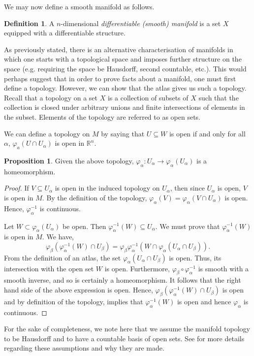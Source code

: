 \documentclass[12pt,a4paper]{article}
\numberwithin{equation}{section}
\theoremstyle{definition}
\newtheorem{definition}{Definition}[section]
\newtheorem{proposition}{Proposition}[section]
\theoremstyle{remark}
\begin{document}
We may now define a smooth manifold as follows.
\begin{definition}
A $n$-dimensional \textit{differentiable (smooth) manifold} is a set $X$ equipped with a differentiable structure.
\end{definition}
As previously stated, there is an alternative characterisation of manifolds in which one starts with a topological space and imposes further structure on the space (e.g. requiring the space be Hausdorff, second countable, etc.). This would perhaps suggest that in order to prove facts about a manifold, one must first define a topology. However, we can show that the atlas gives us such a topology.\\

Recall that a topology on a set $X$ is a collection of subsets of $X$ such that the collection is closed under arbitrary unions and finite intersections of elements in the subset. Elements of the topology are referred to as open sets.

We can define a topology on $M$ by saying that $U\subseteq W$ is open if and only for all $\alpha$, $\varphi_a(U\cap U_\alpha)$ is open in $\mathbb{R}^n$.

\begin{proposition}
Given the above topology, $\varphi_\alpha :U_\alpha\to\varphi_\alpha(U_\alpha)$ is a homeomorphism.
\end{proposition}
\begin{proof}
If $V\subseteq U_\alpha$ is open in the induced topology on $U_\alpha$, then since $U_\alpha$ is open, $V$ is open in $M$. By the definition of the topology, $\varphi_\alpha(V)=\varphi_\alpha(V\cap U_\alpha)$ is open. Hence, $\varphi^{-1}_\alpha$ is continuous.

Let $W\subset\varphi_\alpha(U_\alpha)$ be open. Then $\varphi_\alpha^{-1}(W)\subseteq U_\alpha$. We must prove that $\varphi_\alpha^{-1}(W)$ is open in $M$. We have,
\[
\varphi_\beta(\varphi_\alpha^{-1}(W)\cap U_\beta)=\varphi_\beta\varphi_\alpha^{-1}\left(W\cap\varphi_\alpha(U_\alpha\cap U_\beta)\right).
\]
From the definition of an atlas, the set $\varphi_\alpha(U_\alpha\cap U_\beta)$ is open. Thus, its intersection with the open set $W$ is open. Furthermore, $\varphi_\beta\circ\varphi_\alpha^{-1}$ is smooth with a smooth inverse, and so is certainly a homeomorphism. It follows that the right hand side of the above expression is open. Hence, $\varphi_\beta(\varphi_\alpha^{-1}(W)\cap U_\beta)$ is open and by definition of the topology, implies that $\varphi_\alpha^{-1}(W)$ is open and hence $\varphi_\alpha$ is continuous.  
\end{proof}
For the sake of completeness, we note here that we assume the manifold topology to be Hausdorff and to have a countable basis of open sets. See \cite{MR2766102} for more details regarding these assumptions and why they are made.
\end{document}

